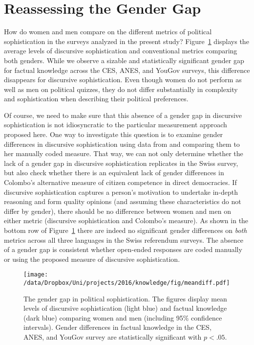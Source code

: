 \section*{Reassessing the Gender Gap}
How do women and men compare on the different metrics of political sophistication in the surveys analyzed in the present study? Figure~\ref{fig:meandiff} displays the average levels of discursive sophistication and conventional metrics comparing both genders. While we observe a sizable and statistically significant gender gap for factual knowledge across the CES, ANES, and YouGov surveys, this difference disappears for discursive sophistication. Even though women do not perform as well as men on political quizzes, they do not differ substantially in complexity and sophistication when describing their political preferences.

Of course, we need to make sure that this absence of a gender gap in discursive sophistication is not idiosyncratic to the particular measurement approach proposed here. One way to investigate this question is to examine gender differences in discursive sophistication using data from \citet{colombo2016justifications} and comparing them to her manually coded measure. That way, we can not only determine whether the lack of a gender gap in discursive sophistication replicates in the Swiss survey, but also check whether there is an equivalent lack of gender differences in Colombo's alternative measure of citizen competence in direct democracies. If discursive sophistication captures a person's motivation to undertake in-depth reasoning and form quality opinions (and assuming these characteristics do not differ by gender), there should be no difference between women and men on either metric (discursive sophistication and Colombo's measure). As shown in the bottom row of Figure~\ref{fig:meandiff} there are indeed no significant gender differences on \textit{both} metrics across all three languages in the Swiss referendum surveys. The absence of a gender gap is consistent whether open-ended responses are coded manually or using the proposed measure of discursive sophistication.

\begin{figure}[ht]\centering
	\texttt{[image: /data/Dropbox/Uni/projects/2016/knowledge/fig/meandiff.pdf]}
	\caption[The gender gap in political sophistication]{The gender gap in political sophistication. The figures display mean levels of discursive sophistication (light blue) and factual knowledge (dark blue) comparing women and men (including 95\% confidence intervals). Gender differences in factual knowledge in the CES, ANES, and YouGov survey are statistically significant with $p<.05$.}\label{fig:meandiff}
\end{figure}

